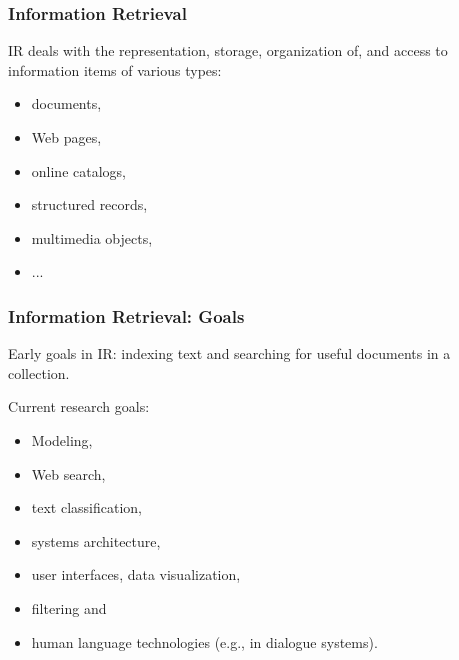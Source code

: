 \documentclass[svgnames]{beamer}
\begin{document}

\begin{frame}
    \frametitle{Information Retrieval}

    \begin{block}{}

        IR deals with the representation, storage, organization of, and
        access to information items of various types:

        \begin{itemize} 
        \item documents, 
        \item Web pages,
        \item online catalogs, 
        \item structured records,
        \item multimedia objects,
        \item ...
        \end{itemize}

    \end{block}

\end{frame}


\begin{frame}
    \frametitle{Information Retrieval: Goals}

    \begin{block}{Early goals in IR:} indexing text and
        searching for useful documents in a collection. 
    \end{block}

    \pause

    \begin{block}{Current research goals:}
        \begin{itemize} 
        \item Modeling, 
        \item Web search,
        \item text classification, 
        \item systems architecture, 
        \item user interfaces, data visualization, 
        \item filtering and
        \item human language technologies (e.g., in dialogue systems).
        \end{itemize}
    \end{block}

\end{frame}
\end{document}
